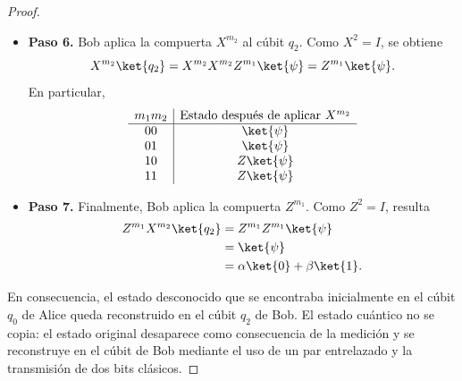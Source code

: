 \documentclass[a4,10pt]{aleph-notas}
\begin{document}
\begin{proof}
\begin{itemize}
        \item \textbf{Paso 6.} Bob aplica la compuerta \(X^{m_2}\) al cúbit \(q_2\). Como \(X^2=I\), se obtiene
        \[
            X^{m_2}\ket{q_2}=X^{m_2}X^{m_2}Z^{m_1}\ket{\psi}=Z^{m_1}\ket{\psi}.
        \]
        En particular,
        \[
            \begin{array}{c|c}
                m_1m_2 & \text{Estado después de aplicar }X^{m_2}\\
                \hline
                00 & \ket{\psi}\\
                01 & \ket{\psi}\\
                10 & Z\ket{\psi}\\
                11 & Z\ket{\psi}
            \end{array}
        \]

        \item \textbf{Paso 7.} Finalmente, Bob aplica la compuerta \(Z^{m_1}\). Como \(Z^2=I\), resulta
        \begin{align*}
            Z^{m_1}X^{m_2}\ket{q_2}
            &=Z^{m_1}Z^{m_1}\ket{\psi}\\
            &=\ket{\psi}\\
            &=\alpha\ket{0}+\beta\ket{1}.
        \end{align*}
    \end{itemize}

    En consecuencia, el estado desconocido que se encontraba inicialmente en el cúbit \(q_0\) de Alice queda reconstruido en el cúbit \(q_2\) de Bob. El estado cuántico no se copia: el estado original desaparece como consecuencia de la medición y se reconstruye en el cúbit de Bob mediante el uso de un par entrelazado y la transmisión de dos bits clásicos.
\end{proof}
\end{document}
